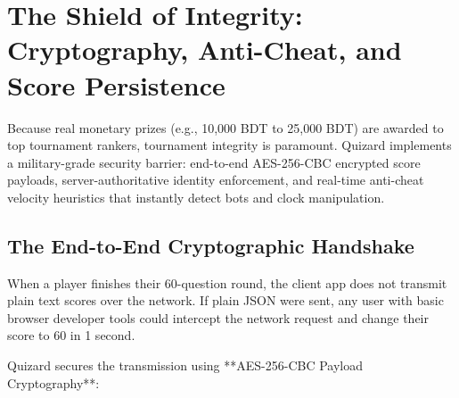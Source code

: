 \chapter{The Shield of Integrity: Cryptography, Anti-Cheat, and Score Persistence}

\begin{tcolorbox}[storybox, title={The Security Engine in Brief}]
Because real monetary prizes (e.g., 10,000 BDT to 25,000 BDT) are awarded to top tournament rankers, tournament integrity is paramount. Quizard implements a military-grade security barrier: end-to-end AES-256-CBC encrypted score payloads, server-authoritative identity enforcement, and real-time anti-cheat velocity heuristics that instantly detect bots and clock manipulation.
\end{tcolorbox}

\section{The End-to-End Cryptographic Handshake}
When a player finishes their 60-question round, the client app does not transmit plain text scores over the network. If plain JSON were sent, any user with basic browser developer tools could intercept the network request and change their score to 60 in 1 second.

Quizard secures the transmission using **AES-256-CBC Payload Cryptography**:

